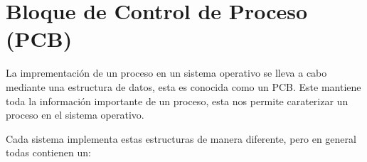 \documentclass[12pt, fleqn]{report}                             %
\begin{document}
        \clearpage
        \section{Bloque de Control de Proceso (PCB)}

            La imprementación de un proceso en un sistema operativo se lleva a cabo mediante
            una estructura de datos, esta es conocida como un PCB.
            Este mantiene toda la información importante de un proceso, esta nos permite 
            caraterizar un proceso en el sistema operativo.

            Cada sistema implementa estas estructuras de manera diferente, pero en general
            todas contienen un:
\end{document}
